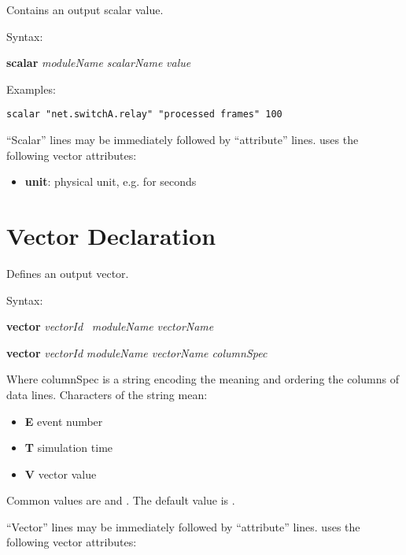 Contains an output scalar value.

Syntax:

\hspace{20mm} \textbf{scalar} \textit{moduleName} \textit{scalarName} \textit{value}

Examples:

\begin{verbatim}
scalar "net.switchA.relay" "processed frames" 100
\end{verbatim}

``Scalar'' lines may be immediately followed by ``attribute'' lines.
\opp uses the following vector attributes:

\begin{itemize}
    \item \textbf{unit}: physical unit, e.g.  for seconds
\end{itemize}



\section{Vector Declaration}

Defines an output vector.

Syntax:

\hspace{20mm} \textbf{vector} \textit{vectorId} \ \textit{moduleName} \textit{vectorName}

\hspace{20mm} \textbf{vector }\textit{vectorId} \textit{moduleName vectorName columnSpec}

Where columnSpec is a string encoding the meaning and ordering
the columns of data lines. Characters of the string mean:

\begin{itemize}
  \item \textbf{E} event number
  \item \textbf{T} simulation time
  \item \textbf{V} vector value
\end{itemize}

Common values are  and . The default value is .

``Vector'' lines may be immediately followed by ``attribute'' lines.
\opp uses the following vector attributes:

